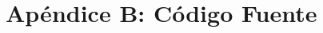 \documentclass[a4paper,10pt,twoside]{article}
\begin{document}

\newpage

\section{Apéndice B: Código Fuente}









\end{document}
